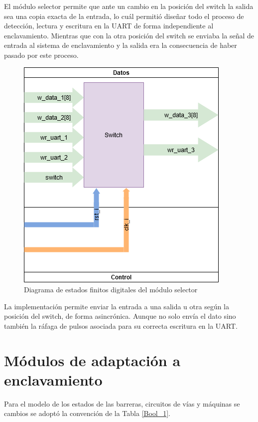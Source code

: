 		El módulo selector permite que ante un cambio en la posición del switch la salida sea una copia exacta de la entrada, lo cuál permitió diseñar todo el proceso de detección, lectura y escritura en la UART de forma independiente al enclavamiento. Mientras que con la otra posición del switch se enviaba la señal de entrada al sistema de enclavamiento y la salida era la consecuencia de haber pasado por este proceso.
		
		\begin{figure}[h]
		\centering
			\includegraphics[scale=.6]{./Figures/FSMD-Selector}
			\caption{Diagrama de estados finitos digitales del módulo selector}
			\label{fig:FSMD_Selector}
		\end{figure}	
		
		\vspace{10cm} 
		
		La implementación permite enviar la entrada a una salida u otra según la posición del switch, de forma asincrónica. Aunque no solo envía el dato sino también la ráfaga de pulsos asociada para su correcta escritura en la UART.
			
\section{Módulos de adaptación a enclavamiento}
	
	Para el modelo de los estados de las barreras, circuitos de vías y máquinas se cambios se adoptó la convención de la Tabla \ref{Bool_1}.
	
